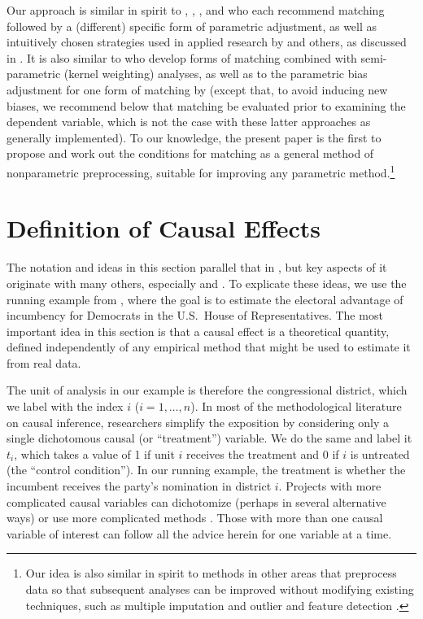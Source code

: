 \documentclass[11pt,titlepage]{article}
\begin{document}
Our approach is similar in spirit to \citet{ImaDyk03},
\citet{RosRub84a}, \citet{Rubin79}, and \citet{RubTho00} who each
recommend matching followed by a (different) specific form of
parametric adjustment, as well as intuitively chosen strategies used
in applied research by \citet{Rosenbaum86} and others, as discussed in
\citet{GlaLevMye03}.  It is also similar to \citet{HecIchTod98} who
develop forms of matching combined with semi-parametric (kernel
weighting) analyses, as well as to the parametric bias adjustment for
one form of matching by \citet{AbaImb04} (except that, to avoid
inducing new biases, we recommend below that matching be evaluated
prior to examining the dependent variable, which is not the case with
these latter approaches as generally implemented).  To our knowledge,
the present paper is the first to propose and work out the conditions
for matching as a general method of nonparametric preprocessing,
suitable for improving any parametric method.\footnote{Our idea is
  also similar in spirit to methods in other areas that preprocess
  data so that subsequent analyses can be improved without modifying
  existing techniques, such as multiple imputation
  \citep{Rubin87,KinHonJos01} and outlier and feature detection
  \citep[][Ch.8]{Bishop95}.}

\section{Definition of Causal Effects}

The notation and ideas in this section parallel that in
\citet[][Section 3.1.1]{KinKeoVer94}, but key aspects of it originate
with many others, especially \citet{Rubin74} and \citet{Holland86}.
To explicate these ideas, we use the running example from
\citet[][Section 3.1.1]{KinKeoVer94}, where the goal is to estimate
the electoral advantage of incumbency for Democrats in the U.S.\ House
of Representatives.  The most important idea in this section is that a
causal effect is a theoretical quantity, defined independently of any
empirical method that might be used to estimate it from real data.

The unit of analysis in our example is therefore the congressional
district, which we label with the index $i$ ($i=1,\dots,n$).  In most
of the methodological literature on causal inference, researchers
simplify the exposition by considering only a single dichotomous
causal (or ``treatment'') variable.  We do the same and label it
$t_i$, which takes a value of 1 if unit $i$ receives the treatment and
0 if $i$ is untreated (the ``control condition'').  In our running
example, the treatment is whether the incumbent receives the party's
nomination in district $i$.  Projects with more complicated causal
variables can dichotomize (perhaps in several alternative ways) or use
more complicated methods \citep{ImaDyk03}.  Those with more than one
causal variable of interest can follow all the advice herein for one
variable at a time.
\end{document}
